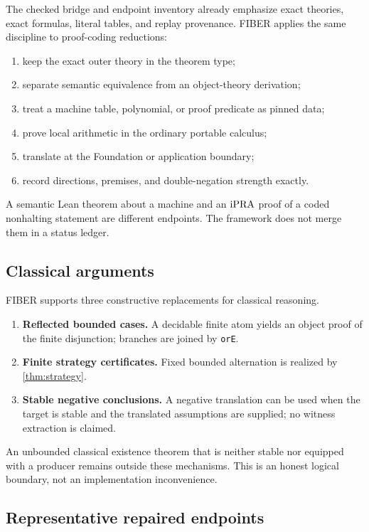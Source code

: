 The checked bridge and endpoint inventory already emphasize exact theories,
exact formulas, literal tables, and replay provenance.  FIBER applies the same
discipline to proof-coding reductions:

\begin{enumerate}
\item keep the exact outer theory in the theorem type;
\item separate semantic equivalence from an object-theory derivation;
\item treat a machine table, polynomial, or proof predicate as pinned data;
\item prove local arithmetic in the ordinary portable calculus;
\item translate at the Foundation or application boundary;
\item record directions, premises, and double-negation strength exactly.
\end{enumerate}

A semantic Lean theorem about a machine and an \(\mathrm{iPRA}\) proof of a coded
nonhalting statement are different endpoints.  The framework does not merge
them in a status ledger.

\subsection{Classical arguments}

FIBER supports three constructive replacements for classical reasoning.

\begin{enumerate}
\item \textbf{Reflected bounded cases.}  A decidable finite atom yields an
      object proof of the finite disjunction; branches are joined by
      \texttt{orE}.
\item \textbf{Finite strategy certificates.}  Fixed bounded alternation is
      realized by \cref{thm:strategy}.
\item \textbf{Stable negative conclusions.}  A negative translation can be
      used when the target is stable and the translated assumptions are
      supplied; no witness extraction is claimed.
\end{enumerate}

An unbounded classical existence theorem that is neither stable nor equipped
with a producer remains outside these mechanisms.  This is an honest logical
boundary, not an implementation inconvenience.

\subsection{Representative repaired endpoints}

